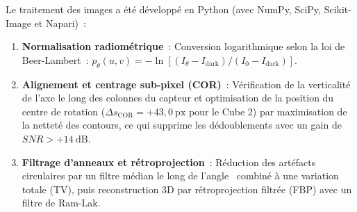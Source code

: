 Le traitement des images a été développé en Python (avec NumPy, SciPy, Scikit-Image et Napari)~:
\begin{enumerate}
    \item \textbf{Normalisation radiométrique}~: Conversion logarithmique selon la loi de Beer-Lambert~: $p_\theta(u, v) = -\ln[ (I_\theta - I_{\text{dark}})/(I_0 - I_{\text{dark}}) ]$.
    \item \textbf{Alignement et centrage sub-pixel (COR)}~: Vérification de la verticalité de l'axe le long des colonnes du capteur et optimisation de la position du centre de rotation ($\Delta s_{\text{COR}} = +43{,}0~\text{px}$ pour le Cube 2) par maximisation de la netteté des contours, ce qui supprime les dédoublements avec un gain de $SNR > +14~\text{dB}$.
    \item \textbf{Filtrage d'anneaux et rétroprojection}~: Réduction des artéfacts circulaires par un filtre médian le long de l'angle~\cite{sijbers2004reduction} combiné à une variation totale (TV), puis reconstruction 3D par rétroprojection filtrée (FBP) avec un filtre de Ram-Lak.
\end{enumerate}
